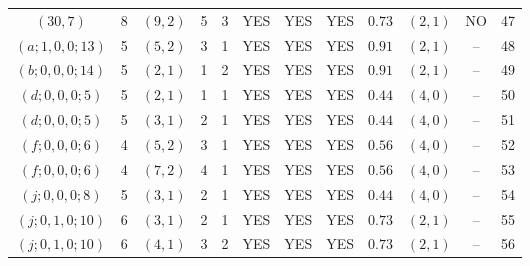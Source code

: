 \begin{longtable}{|c|c|c|c|c|c|c|c|c|c|c|c|}
$(30,7)$ & 8 & $(9,2)$ & 5 & 3 & YES & YES & YES & $0.73$ & $(2,1)$ & NO & 47\\
$(a;1,0,0;13)$ & 5 & $(5,2)$ & 3 & 1 & YES & YES & YES & $0.91$ & $(2,1)$ & -- & 48\\
$(b;0,0,0;14)$ & 5 & $(2,1)$ & 1 & 2 & YES & YES & YES & $0.91$ & $(2,1)$ & -- & 49\\
$(d;0,0,0;5)$ & 5 & $(2,1)$ & 1 & 1 & YES & YES & YES & $0.44$ & $(4,0)$ & -- & 50\\
$(d;0,0,0;5)$ & 5 & $(3,1)$ & 2 & 1 & YES & YES & YES & $0.44$ & $(4,0)$ & -- & 51\\
$(f;0,0,0;6)$ & 4 & $(5,2)$ & 3 & 1 & YES & YES & YES & $0.56$ & $(4,0)$ & -- & 52\\
$(f;0,0,0;6)$ & 4 & $(7,2)$ & 4 & 1 & YES & YES & YES & $0.56$ & $(4,0)$ & -- & 53\\
$(j;0,0,0;8)$ & 5 & $(3,1)$ & 2 & 1 & YES & YES & YES & $0.44$ & $(4,0)$ & -- & 54\\
$(j;0,1,0;10)$ & 6 & $(3,1)$ & 2 & 1 & YES & YES & YES & $0.73$ & $(2,1)$ & -- & 55\\
$(j;0,1,0;10)$ & 6 & $(4,1)$ & 3 & 2 & YES & YES & YES & $0.73$ & $(2,1)$ & -- & 56
\end{longtable}
